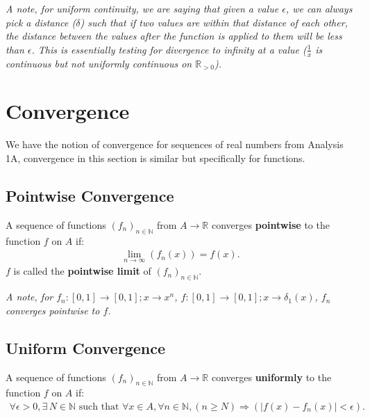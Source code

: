 \documentclass[a4paper, 12pt, twoside]{article}
\begin{document}
\vspace{\baselineskip}

\textit{A note, for uniform continuity, we are saying that given a value
      $\epsilon$, we can always pick a distance ($\delta$) such that
      if two values are within that distance of each other, the distance
      between the values after the function is applied to them
      will be less than $\epsilon$. This is essentially testing for
      divergence to infinity at a value ($\frac{1}{x}$ is continuous
      but not uniformly continuous on $\mathbb{R}_{>0}$).}

\newpage

\section{Convergence}

We have the notion of convergence for sequences of real numbers
from Analysis 1A, convergence in this section is similar but
specifically for functions.

\subsection{Pointwise Convergence}

A sequence of functions $(f_n)_{n \in \mathbb{N}}$ from
$A \to \mathbb{R}$ converges \textbf{pointwise} to the function
$f$ on $A$ if:
\begin{align*}
      \lim_{n \to \infty}(f_n(x)) = f(x). \tag{$\forall x \in A$}
\end{align*}
$f$ is called the \textbf{pointwise limit} of $(f_n)_{n \in \mathbb{N}}$.

\vspace{\baselineskip}

\textit{A note, for $f_n:[0, 1]\to[0, 1]; x \to x^n$,
$f:[0, 1] \to [0, 1]; x \to \delta_1(x)$, $f_n$ converges pointwise
to $f$.}

\subsection{Uniform Convergence}

A sequence of functions $(f_n)_{n \in \mathbb{N}}$ from
$A \to \mathbb{R}$ converges \textbf{uniformly} to the
function $f$ on $A$ if:
\begin{align*}
      \forall \epsilon > 0, \exists\,N \in \mathbb{N} \text{ such that }
      \forall x \in A, \forall n \in \mathbb{N},
      (n \geq N) \Rightarrow (|f(x) - f_n(x)| < \epsilon).
\end{align*}
\end{document}
